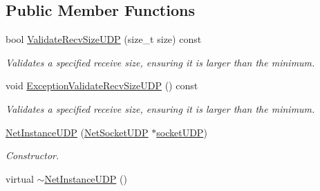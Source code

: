 \subsection*{Public Member Functions}
\begin{DoxyCompactItemize}
\item 
bool \hyperlink{class_net_instance_u_d_p_accb9b70281aca221889f56d2e1f5fe29}{ValidateRecvSizeUDP} (size\_\-t size) const 
\begin{DoxyCompactList}\small\item\em Validates a specified receive size, ensuring it is larger than the minimum. \item\end{DoxyCompactList}\item 
void \hyperlink{class_net_instance_u_d_p_a5a8b36bdaad4e330b40e3524d8d5de89}{ExceptionValidateRecvSizeUDP} () const 
\begin{DoxyCompactList}\small\item\em Validates a specified receive size, ensuring it is larger than the minimum. \item\end{DoxyCompactList}\item 
\hyperlink{class_net_instance_u_d_p_a35d73fe054fab74bd10f08ecf609d58f}{NetInstanceUDP} (\hyperlink{class_net_socket_u_d_p}{NetSocketUDP} $\ast$\hyperlink{class_net_instance_u_d_p_af86e8343ddf2daf0ce3f9ea701bc7cf3}{socketUDP})
\begin{DoxyCompactList}\small\item\em Constructor. \item\end{DoxyCompactList}\item 
\hypertarget{class_net_instance_u_d_p_a966ce2be724f20ba2518d3165af98fa7}{
virtual \hyperlink{class_net_instance_u_d_p_a966ce2be724f20ba2518d3165af98fa7}{$\sim$NetInstanceUDP} ()}
\label{class_net_instance_u_d_p_a966ce2be724f20ba2518d3165af98fa7}


\end{DoxyCompactItemize}
